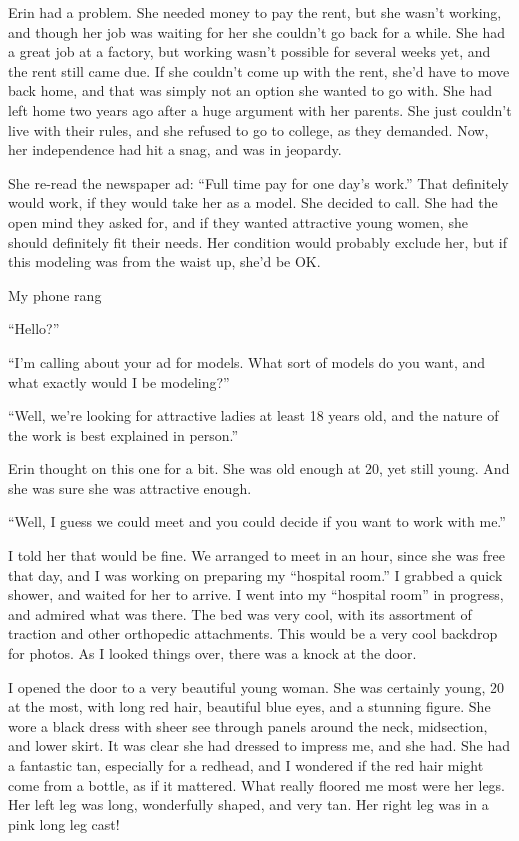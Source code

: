 Erin had a problem. She needed money to pay the rent, but she wasn't working, and though her
job was waiting for her she couldn't go back for a while. She had a great job at a factory, but
working wasn't possible for several weeks yet, and the rent still came due. If she couldn't come
up with the rent, she'd have to move back home, and that was simply not an option she wanted to
go with. She had left home two years ago after a huge argument with her parents. She just
couldn't live with their rules, and she refused to go to college, as they demanded. Now, her
independence had hit a snag, and was in jeopardy.

She re-read the newspaper ad: ``Full time pay for one day's work.'' That definitely would
work, if they would take her as a model. She decided to call. She had the open mind they asked
for, and if they wanted attractive young women, she should definitely fit their needs. Her
condition would probably exclude her, but if this modeling was from the waist up, she'd be OK.

My phone rang

``Hello?''

``I'm calling about your ad for models. What sort of models do you want, and what exactly
would I be modeling?''

``Well, we're looking for attractive ladies at least 18 years old, and the nature of the
work is best explained in person.''

Erin thought on this one for a bit. She was old enough at 20, yet still young. And she was
sure she was attractive enough.

``Well, I guess we could meet and you could decide if you want to work with me.''

I told her that would be fine. We arranged to meet in an hour, since she was free that day,
and I was working on preparing my ``hospital room.'' I grabbed a quick shower, and waited for
her to arrive. I went into my ``hospital room'' in progress, and admired what was there. The bed
was very cool, with its assortment of traction and other orthopedic attachments. This would be a
very cool backdrop for photos. As I looked things over, there was a knock at the door.

I opened the door to a very beautiful young woman. She was certainly young, 20 at the most,
with long red hair, beautiful blue eyes, and a stunning figure. She wore a black dress with
sheer see through panels around the neck, midsection, and lower skirt. It was clear she had
dressed to impress me, and she had. She had a fantastic tan, especially for a redhead, and I
wondered if the red hair might come from a bottle, as if it mattered. What really floored me
most were her legs. Her left leg was long, wonderfully shaped, and very tan. Her right leg was
in a pink long leg cast!
